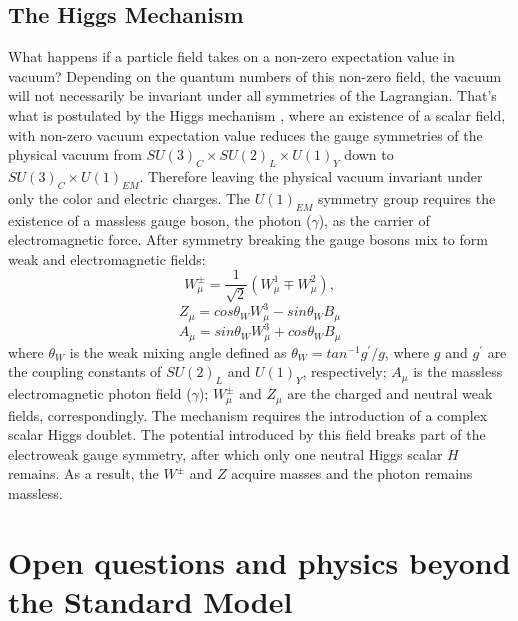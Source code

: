\subsection{The Higgs Mechanism}

What happens if a particle field takes on a non-zero expectation value in vacuum? Depending on the
quantum numbers of this non-zero field, the vacuum will not necessarily be invariant under
all symmetries of the Lagrangian. That's what is postulated by the Higgs mechanism
\cite{Anderson:1963pc,Englert:1964et,Higgs:1964pj}, where
an existence of a scalar field, with non-zero vacuum expectation value
reduces the gauge symmetries of the physical 
vacuum from $SU(3)_C \times SU(2)_L \times U(1)_Y$
down to $SU(3)_C \times U(1)_{EM}$. Therefore leaving the physical vacuum invariant under
only the color and electric charges. 
The $U(1)_{EM}$ symmetry group requires the existence of a massless
gauge boson, the photon ($\gamma$), as the carrier of electromagnetic force.
After symmetry breaking the gauge bosons mix to form weak and electromagnetic fields:
\begin{equation}
W_{\mu}^{\pm}=\frac{1}{\sqrt{2}}\left( W_{\mu}^1 \mp W_{\mu}^{2}\right),
\end{equation}
\begin{equation}
Z_{\mu}=cos\theta_W W_{\mu}^3-sin\theta_W B_{\mu}
\end{equation}
\begin{equation}
A_{\mu}=sin\theta_W W_{\mu}^3+cos\theta_W B_{\mu}
\end{equation}
where $\theta_W$ is the weak mixing angle defined as $\theta_W=tan^{-1} g^{'}/g$, where $g$ 
and $g^{'}$ are the coupling constants of $SU(2)_L$ and $U(1)_Y$, respectively; $A_{\mu}$ is the 
massless electromagnetic photon field ($\gamma$); $W_{\mu}^{\pm}$ and $Z_{\mu}$ are the charged 
and neutral weak fields, correspondingly. The mechanism requires the introduction of a complex
scalar Higgs doublet. The potential introduced by this field breaks part of the electroweak
 gauge symmetry,
after which only one neutral Higgs scalar $H$ remains. As a result, 
the $W^{\pm}$ and $Z$ acquire masses and the photon remains massless.

\section{Open questions and physics beyond the Standard Model}

